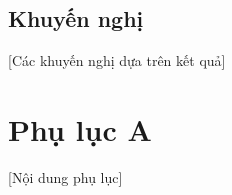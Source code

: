 \documentclass[12pt,a4paper]{article}
\begin{document}
\subsection{Khuyến nghị}
[Các khuyến nghị dựa trên kết quả]





\appendix
\section{Phụ lục A}
[Nội dung phụ lục]
\end{document}

